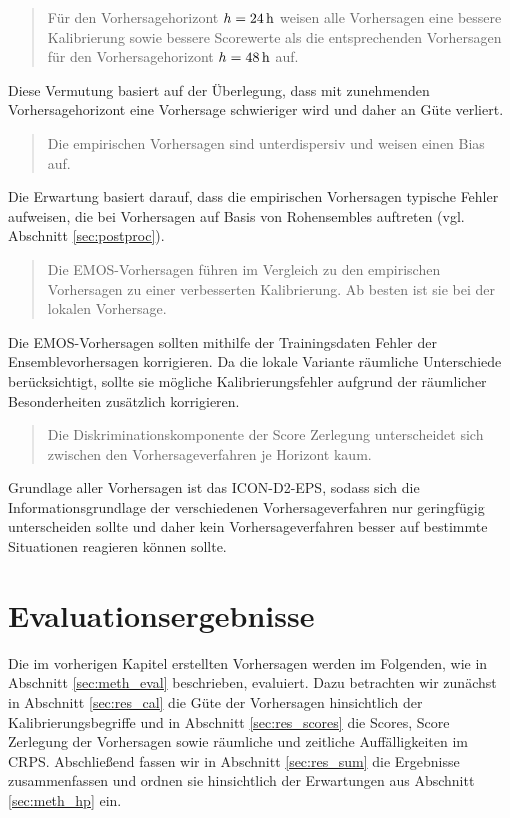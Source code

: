\begin{quote}
Für den Vorhersagehorizont $h=24\,\mathrm{h}$ weisen alle Vorhersagen eine bessere Kalibrierung sowie bessere Scorewerte als die entsprechenden Vorhersagen für den Vorhersagehorizont $h=48\,\mathrm{h}$ auf. 
\end{quote}
Diese Vermutung basiert auf der Überlegung, dass mit zunehmenden Vorhersagehorizont eine Vorhersage schwieriger wird und daher an Güte verliert.
\begin{quote}
Die empirischen Vorhersagen sind unterdispersiv und weisen einen Bias auf.
\end{quote}
Die Erwartung basiert darauf, dass die empirischen Vorhersagen typische Fehler aufweisen, die bei Vorhersagen auf Basis von Rohensembles auftreten (vgl. Abschnitt \ref{sec:postproc}).
\begin{quote}
Die EMOS-Vorhersagen führen im Vergleich zu den empirischen Vorhersagen zu einer verbesserten Kalibrierung. Ab besten ist sie bei der lokalen Vorhersage.
\end{quote}
Die EMOS-Vorhersagen sollten mithilfe der Trainingsdaten Fehler der Ensemblevorhersagen korrigieren. Da die lokale Variante räumliche Unterschiede berücksichtigt, sollte sie mögliche Kalibrierungsfehler aufgrund der räumlicher Besonderheiten zusätzlich korrigieren.
\begin{quote}
Die Diskriminationskomponente der Score Zerlegung unterscheidet sich zwischen den Vorhersageverfahren je Horizont kaum.
\end{quote}
Grundlage aller Vorhersagen ist das ICON-D2-EPS, sodass sich die Informationsgrundlage der verschiedenen Vorhersageverfahren nur geringfügig unterscheiden sollte und daher kein Vorhersageverfahren besser auf bestimmte Situationen reagieren können sollte.


\chapter{Evaluationsergebnisse} \label{chap:res}
Die im vorherigen Kapitel erstellten Vorhersagen werden im Folgenden, wie in Abschnitt \ref{sec:meth_eval} beschrieben, evaluiert. Dazu betrachten wir zunächst in Abschnitt \ref{sec:res_cal} die Güte der Vorhersagen hinsichtlich der Kalibrierungsbegriffe und in Abschnitt \ref{sec:res_scores} die Scores, Score Zerlegung der Vorhersagen sowie räumliche und zeitliche Auffälligkeiten im CRPS. Abschließend fassen wir in Abschnitt \ref{sec:res_sum} die Ergebnisse zusammenfassen und ordnen sie hinsichtlich der Erwartungen aus Abschnitt \ref{sec:meth_hp} ein.


